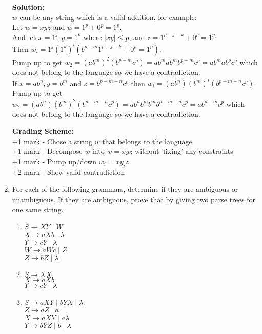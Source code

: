 \documentclass[11pt, article, oneside]{memoir}
\begin{document}
\begin{enumerate}
        \textbf{Solution:}
        \\\(w\) can be any string which is a valid addition, for example:
        \\Let \(w = xyz\) and \(w = 1^p+0^p=1^p\).
        \\And let \(x = 1^j, y = 1^k\) where \(|xy| \leq p\), and \(z = 1^{p - j - k}+0^p=1^p\).
        \\Then \(w_i = 1^j(1^k)^i(b^{p - m}1^{p - j - k}+0^p=1^p)\).
        \\Pump up to get \(w_2 = (ab^m)^2(b^{p - m}c^p) = ab^mab^mb^{p - m}c^p = ab^mab^pc^p\) which does not belong to the language so we have a contradiction.
        \\If \(x = ab^n, y = b^m\) and \(z = b^{p - m - n}c^p\) then \(w_i = (ab^n)(b^m)^i(b^{p - m - n}c^p)\). Pump up to get \(w_2 = (ab^n)(b^m)^2(b^{p - m - n}c^p) = ab^nb^mb^mb^{p - m - n}c^p = ab^{p + m}c^p\) which does not belong to the language so we have a contradiction.

        \textbf{Grading Scheme:}
        \\+1 mark - Chose a string \(w\) that belongs to the language
        \\+1 mark - Decompose \(w\) into \(w = xyz\) without 'fixing' any constraints
        \\+1 mark - Pump up/down \(w_i = xy_iz\)
        \\+2 mark - Show valid contradiction
        
    \item
        For each of the following grammars, determine if they are ambiguous or unambiguous. If they are ambiguous, prove that by giving two parse trees for one same string.
        \begin{enumerate}
            \item
                \(S \rightarrow XY \mid W \)
                \\\(X \rightarrow aXb \mid \lambda\)
                \\\(Y \rightarrow cY \mid \lambda\)
                \\\(W \rightarrow aWc \mid Z\)
                \\\(Z \rightarrow bZ \mid \lambda\)
            \item
                \(S \rightarrow XX \)
                \\\(X \rightarrow aXb\)
                \\\(Y \rightarrow cY \mid \lambda\)
            \item
                \(S \rightarrow aXY \mid bYX \mid \lambda \)
                \\\(Z \rightarrow aZ \mid a\)
                \\\(X \rightarrow aXY \mid a \lambda\)
                \\\(Y \rightarrow bYZ \mid b \mid \lambda\) 
        \end{enumerate}


\end{enumerate}
\end{document}
